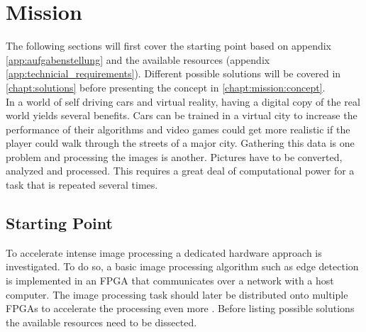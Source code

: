 %
%
\chapter{Mission} \label{chapt:mission}
The following sections will
first cover the starting point based on appendix \ref{app:aufgabenstellung} and the available resources (appendix \ref{app:technicial_requirements}). Different possible
solutions will be covered in \ref{chapt:solutions} before presenting the concept
in \ref{chapt:mission:concept}.
\\

In a world of self driving cars and virtual reality, having a digital copy of
the real world yields several benefits. Cars can be trained in a virtual city
to increase the performance of their algorithms and video games could get more
realistic if the player could walk through the streets of a major city. Gathering
this data is one problem and processing the images is another. Pictures have
to be converted, analyzed and processed. This requires a great deal of
computational power for a task that is repeated several times.

%
%
\section{Starting Point}
To accelerate intense image processing a dedicated hardware approach is
investigated. To do so, a basic image processing algorithm such as edge
detection is implemented in an FPGA that communicates over a network with a host
computer. The image processing task should later be distributed onto multiple
FPGAs to accelerate the processing even more \cite{nomokoReqs}. Before listing possible solutions the available resources need to
be dissected.


